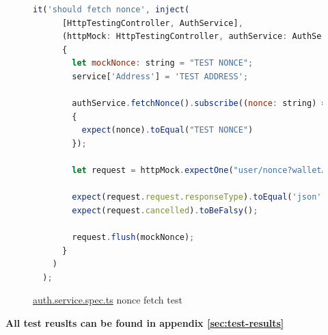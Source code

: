 \begin{figure}[H]
\caption{\href{https://github.com/MrHarrisonBarker/CRPL/blob/main/CRPL.Web/ClientApp/src/app/_Services/auth.service.spec.ts}{auth.service.spec.ts} nonce fetch test}
\centering
\begin{lstlisting}[language=JavaScript]
it('should fetch nonce', inject(
      [HttpTestingController, AuthService],
      (httpMock: HttpTestingController, authService: AuthService) =>
      {
        let mockNonce: string = "TEST NONCE";
        service['Address'] = 'TEST ADDRESS';

        authService.fetchNonce().subscribe((nonce: string) =>
        {
          expect(nonce).toEqual("TEST NONCE")
        });

        let request = httpMock.expectOne("user/nonce?walletAddress=TEST%20ADDRESS");

        expect(request.request.responseType).toEqual('json');
        expect(request.cancelled).toBeFalsy();

        request.flush(mockNonce);
      }
    )
  );
\end{lstlisting}
\end{figure}

\textbf{All test reuslts can be found in appendix \ref{sec:test-results}}



